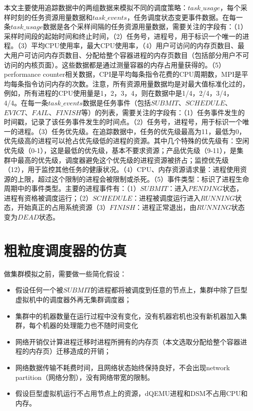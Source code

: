 本文主要使用追踪数据中的两组数据来模拟不同的调度策略：$task\_usage$，每个采样时刻的任务资源用量数据和$task\_events$，任务调度状态变更事件数据。在每一条$task\_usage$数据是各个采样间隔的任务资源用量数据，需要关注的字段有：（1）采样时间段的起始时间和终止时间，（2）任务号，进程号，用于标识一个唯一的进程。（3）平均CPU使用率，最大CPU使用率，（4）用户可访问的内存页数目、最大用户可访问内存页数目、分配给整个容器进程的内存页数目（包括部分用户不可访问的内核页面）。这些数据都是通过测量容器的内存占用量获得的。（5）performance counter相关数据，CPI是平均每条指令花费的CPU周期数，MPI是平均每条指令访问内存的次数。注意，所有资源用量数据均是对最大值标准化过的，例如，所有进程的CPU使用量是1，2，3，4，则在数据中是1/4，2/4，3/4，4/4。在每一条$task\_events$数据是任务事件（包括$SUBMIT$、$SCHEDULE$、$EVICT$、$FAIL$、$FINISH$等）的列表，需要关注的字段有：（1）任务事件发生的时间戳，记录了该任务事件发生的时间点。（2）任务号，进程号，用于标识一个唯一的进程。（3）任务优先级。在追踪数据中，任务的优先级最高为11，最低为0，优先级高的进程可以抢占优先级低的进程的资源。其中几个特殊的优先级有：空闲优先级（0-1），这是最低的优先级，基本不要求资源；产品优先级（9-11），是集群中最高的优先级，调度器避免这个优先级的进程资源被挤占；监控优先级（12），用于监控其他任务的健康状况。（4）CPU、内存资源请求量：进程使用资源的上限，超过这个限制的进程会被限制或杀死。（5）事件类型：标识了进程生命周期中的事件类型。主要的进程事件有：（1）$SUBMIT$：进入$PENDING$状态，进程有资格被调度运行；（2）$SCHEDULE$：进程被调度运行进入$RUNNING$状态，开始真正的占用系统资源（3）$FINISH$：进程正常退出，由$RUNNING$状态变为$DEAD$状态。

\section{粗粒度调度器的仿真}
做集群模拟之前，需要做一些简化假设：
\begin{itemize}
  \item 假设任何一个被$SUBMIT$的进程都将被调度到任意的节点上，集群中除了巨型虚拟机中的调度器外再无集群调度器；
  \item 集群中的机器数量在运行过程中没有变化，没有机器宕机也没有新机器加入集群，每个机器的处理能力也不随时间变化
  \item 网络开销仅计算进程迁移时进程所拥有的内存页（本文选取分配给整个容器进程的内存页）迁移造成的开销；
  \item 网络数据传输不耗费时间，且网络状态始终保持良好，不会出现network partition（网络分割），没有网络带宽的限制。
  \item 假设巨型虚拟机运行不占用节点上的资源，dQEMU进程和DSM不占用CPU和内存。
\end{itemize}

